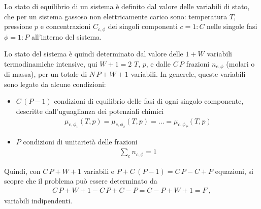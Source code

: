 \documentclass[letterpaper,10pt,italian]{jupyterBook}
\begin{document}
\sphinxAtStartPar
Lo stato di equilibrio di un sistema è definito dal valore delle variabili di stato, che per un sistema gassoso non elettricamente carico sono: temperatura \(T\), pressione \(p\) e concentrazioni \(C_{c,\phi}\) dei singoli componenti \(c=1:C\) nelle singole fasi \(\phi = 1:P\) all’interno del sistema.

\sphinxAtStartPar
Lo stato del sistema è quindi determinato dal valore delle \(1+W\) variabili termodinamiche intensive, qui \(W+1=2\) \(T\), \(p\), e dalle \(C \, P\) frazioni \(n_{c,\phi}\) (molari o di massa), per un totale di \(N \, P + W + 1\) variabili.
In generele, queste variabili sono legate da alcune condizioni:
\begin{itemize}
\item {} 
\sphinxAtStartPar
\(C \, (P-1)\) condizioni di equilibrio delle fasi di ogni singolo componente, descritte dall’uguaglianza dei potenziali chimici
\begin{equation*}
\begin{split}\mu_{c,\phi_1}(T,p) = \mu_{c,\phi_2}(T,p) = \dots = \mu_{c,\phi_P}(T,p)\end{split}
\end{equation*}
\item {} 
\sphinxAtStartPar
\(P\) condizioni di unitarietà delle frazioni
\begin{equation*}
\begin{split}\sum_{c} n_{c,\phi} = 1\end{split}
\end{equation*}
\end{itemize}

\sphinxAtStartPar
Quindi, con \(C \, P + W + 1\) variabili e \(P + C\, (P-1) = C \, P - C + P\) equazioni, si scopre che il problema può essere determinato da
\begin{equation*}
\begin{split}C \, P + W + 1 - C \, P + C - P  =  C - P + W + 1 = F \ ,\end{split}
\end{equation*}
\sphinxAtStartPar
variabili indipendenti.
\end{document}
